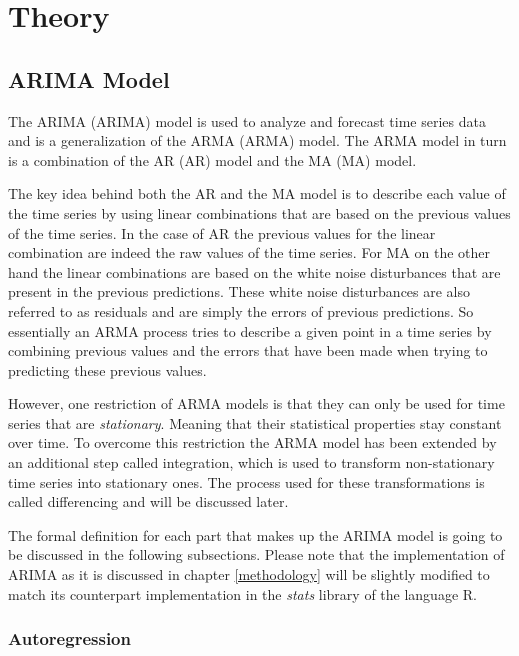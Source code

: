 \chapter{Theory}
\section{ARIMA Model}\label{arimamodel}
\newtheorem{definition}{Definition}[section]

The \acl{ARIMA} (\acs{ARIMA}) model is used to analyze and forecast time series data and is a generalization of the \acl{ARMA} (\acs{ARMA}) model. The \acs{ARMA} model in turn is a combination of the \acl{AR} (\acs{AR}) model and the \acl{MA} (\acs{MA}) model.\textsuperscript{\cite{Brockwell2002Introduction2nd}}

The key idea behind both the \acs{AR} and the \acs{MA} model is to describe each value of the time series by using linear combinations that are based on the previous values of the time series. In the case of \acl{AR} the previous values for the linear combination are indeed the raw values of the time series. For \acl{MA} on the other hand the linear combinations are based on the white noise disturbances that are present in the previous predictions. These white noise disturbances are also referred to as residuals and are simply the errors of previous predictions. So essentially an \acs{ARMA} process tries to describe a given point in a time series by combining previous values and the errors that have been made when trying to predicting these previous values. 

However, one restriction of \acs{ARMA} models is that they can only be used for time series that are \textit{stationary}. Meaning that their statistical properties stay constant over time. To overcome this restriction the \acs{ARMA} model has been extended by an additional step called integration, which is used to transform non-stationary time series into stationary ones. The process used for these transformations is called differencing and will be discussed later.

The formal definition for each part that makes up the \acl{ARIMA} model is going to be discussed in the following subsections. Please note that the implementation of \acs{ARIMA} as it is discussed in chapter \ref{methodology} will be slightly modified to match its counterpart implementation in the \textit{stats} library of the language R.

\break
\subsection*{Autoregression}\label{AR}

